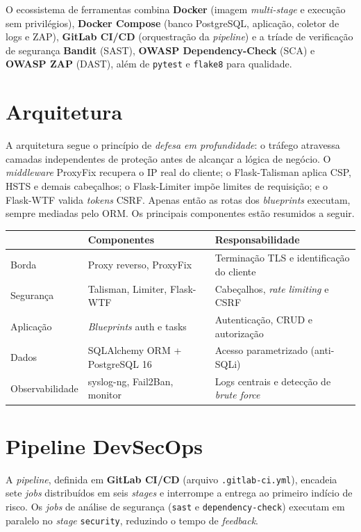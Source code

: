\documentclass[11pt,a4paper]{article}
\newcommand{\thd}[1]{{\color{white}\bfseries #1}}
\begin{document}
O ecossistema de ferramentas combina \textbf{Docker} (imagem \emph{multi-stage} e execução sem privilégios), \textbf{Docker Compose} (banco PostgreSQL, aplicação, coletor de logs e ZAP), \textbf{GitLab CI/CD} (orquestração da \emph{pipeline}) e a tríade de verificação de segurança \textbf{Bandit} (SAST), \textbf{OWASP Dependency-Check} (SCA) e \textbf{OWASP ZAP} (DAST), além de \texttt{pytest} e \texttt{flake8} para qualidade.

\section{Arquitetura}
A arquitetura segue o princípio de \emph{defesa em profundidade}: o tráfego atravessa camadas independentes de proteção antes de alcançar a lógica de negócio. O \emph{middleware} ProxyFix recupera o IP real do cliente; o Flask-Talisman aplica CSP, HSTS e demais cabeçalhos; o Flask-Limiter impõe limites de requisição; e o Flask-WTF valida \emph{tokens} CSRF. Apenas então as rotas dos \emph{blueprints} executam, sempre mediadas pelo ORM. Os principais componentes estão resumidos a seguir.

\begin{tabularx}{\textwidth}{L{2.4cm} L{4.7cm} X}
\toprule
\rowcolor{tgGreen}\thd{Camada} & \thd{Componentes} & \thd{Responsabilidade}\\
\midrule
Borda          & Proxy reverso, ProxyFix            & Terminação TLS e identificação do cliente\\
Segurança      & Talisman, Limiter, Flask-WTF       & Cabeçalhos, \emph{rate limiting} e CSRF\\
Aplicação      & \emph{Blueprints} auth e tasks     & Autenticação, CRUD e autorização\\
Dados          & SQLAlchemy ORM + PostgreSQL 16     & Acesso parametrizado (anti-SQLi)\\
Observabilidade & syslog-ng, Fail2Ban, monitor      & Logs centrais e detecção de \emph{brute force}\\
\bottomrule
\end{tabularx}

\section{Pipeline DevSecOps}
A \emph{pipeline}, definida em \textbf{GitLab CI/CD} (arquivo \texttt{.gitlab-ci.yml}), encadeia sete \emph{jobs} distribuídos em seis \emph{stages} e interrompe a entrega ao primeiro indício de risco. Os \emph{jobs} de análise de segurança (\texttt{sast} e \texttt{dependency-check}) executam em paralelo no \emph{stage} \texttt{security}, reduzindo o tempo de \emph{feedback}.
\end{document}
